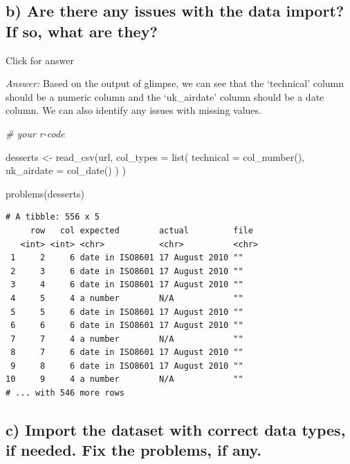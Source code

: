 \documentclass[
]{book}
\newenvironment{Shaded}{\begin{snugshade}}{\end{snugshade}}
\newcommand{\AttributeTok}[1]{\textcolor[rgb]{0.77,0.63,0.00}{#1}}
\newcommand{\CommentTok}[1]{\textcolor[rgb]{0.56,0.35,0.01}{\textit{#1}}}
\newcommand{\FunctionTok}[1]{\textcolor[rgb]{0.00,0.00,0.00}{#1}}
\newcommand{\NormalTok}[1]{#1}
\newcommand{\OtherTok}[1]{\textcolor[rgb]{0.56,0.35,0.01}{#1}}
\begin{document}
\hypertarget{b-are-there-any-issues-with-the-data-import-if-so-what-are-they}{%
\subsection{b) Are there any issues with the data import? If so, what are they?}\label{b-are-there-any-issues-with-the-data-import-if-so-what-are-they}}

Click for answer

\emph{Answer:} Based on the output of glimpse, we can see that the `technical' column should be a numeric column and the `uk\_airdate' column should be a date column. We can also identify any issues with missing values.

\begin{Shaded}
\begin{Highlighting}[]
\CommentTok{\# your r{-}code}

\NormalTok{desserts }\OtherTok{\textless{}{-}} \FunctionTok{read\_csv}\NormalTok{(url,}
  \AttributeTok{col\_types =} \FunctionTok{list}\NormalTok{(}
    \AttributeTok{technical =} \FunctionTok{col\_number}\NormalTok{(),}
    \AttributeTok{uk\_airdate =} \FunctionTok{col\_date}\NormalTok{()}
\NormalTok{  )}
\NormalTok{)}

\FunctionTok{problems}\NormalTok{(desserts)}
\end{Highlighting}
\end{Shaded}

\begin{verbatim}
# A tibble: 556 x 5
     row   col expected        actual         file 
   <int> <int> <chr>           <chr>          <chr>
 1     2     6 date in ISO8601 17 August 2010 ""   
 2     3     6 date in ISO8601 17 August 2010 ""   
 3     4     6 date in ISO8601 17 August 2010 ""   
 4     5     4 a number        N/A            ""   
 5     5     6 date in ISO8601 17 August 2010 ""   
 6     6     6 date in ISO8601 17 August 2010 ""   
 7     7     4 a number        N/A            ""   
 8     7     6 date in ISO8601 17 August 2010 ""   
 9     8     6 date in ISO8601 17 August 2010 ""   
10     9     4 a number        N/A            ""   
# ... with 546 more rows
\end{verbatim}

\hypertarget{c-import-the-dataset-with-correct-data-types-if-needed.-fix-the-problems-if-any.}{%
\subsection{c) Import the dataset with correct data types, if needed. Fix the problems, if any.}\label{c-import-the-dataset-with-correct-data-types-if-needed.-fix-the-problems-if-any.}}
\end{document}

